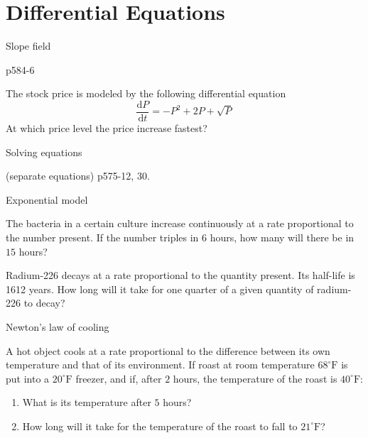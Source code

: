 \section[DiffEqn]{Differential Equations}
\begin{frame}{Slope field}

\begin{example}
p584-6
\end{example}



\begin{example}
The stock price is modeled by the following differential equation
\[
\frac{\mathrm{d}P}{\mathrm{d}t}=-P^{2}+2P+\sqrt{P}
\]
At which price level the price increase fastest?
\end{example}

\end{frame}

\begin{frame}{Solving equations}

\begin{example}
(separate equations) p575-12, 30.
\end{example}

\end{frame}

\begin{frame}{Exponential model}

\begin{example}
The bacteria in a certain culture increase continuously at a rate
proportional to the number present. If the number triples in $6$
hours, how many will there be in $15$ hours?
\end{example}



\begin{example}
Radium-226 decays at a rate proportional to the quantity present.
Its half-life is 1612 years. How long will it take for one quarter
of a given quantity of radium-226 to decay?
\end{example}

\end{frame}

\begin{frame}{Newton's law of cooling}

\begin{example}
A hot object cools at a rate proportional to the difference between
its own temperature and that of its environment. If roast at room
temperature $68^{\circ}\mathrm{F}$ is put into a $20^{\circ}\mathrm{F}$
freezer, and if, after $2$ hours, the temperature of the roast is
$40^{\circ}\mathrm{F}$:
\begin{enumerate}
\item What is its temperature after $5$ hours?
\item How long will it take for the temperature of the roast to fall to
$21^{\circ}\mathrm{F}$?
\end{enumerate}

\end{example}

\end{frame}

